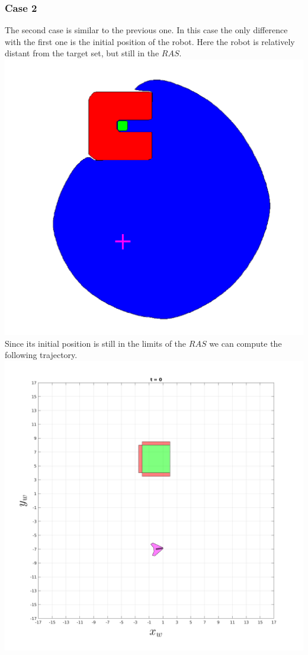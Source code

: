     \subsubsection{Case 2}
    The second case is similar to the previous one. In this case the only difference with the first one is the initial position of the robot. Here the robot is relatively distant from the target set, but still in the $RAS$. 
    \includegraphics[scale=0.25]{figures/dynamic2Dras2.png}
    \\
    Since its initial position is still in the limits of the $RAS$ we can compute the following trajectory.
    \\
    \includegraphics[scale=0.25]{figures/dynamicTRAJ3.png}
